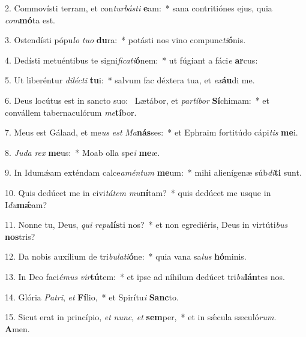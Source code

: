 2. Commovísti terram, et con\textit{tur}\textit{bás}\textit{ti} \textbf{e}am:~*  sana contritiónes ejus, quia \textit{com}\textbf{mó}ta est.\

3. Ostendísti pópu\textit{lo} \textit{tu}\textit{o} \textbf{du}ra:~*  potásti nos vino compunc\textit{ti}\textbf{ó}nis.\

4. Dedísti metuéntibus te signi\textit{fi}\textit{ca}\textit{ti}\textbf{ó}nem:~*  ut fúgiant a fáci\textit{e} \textbf{ar}cus:\

5. Ut liberéntur \textit{di}\textit{léc}\textit{ti} \textbf{tu}i:~*  salvum fac déxtera tua, et \textit{ex}\textbf{áu}di me.\

6. Deus locútus est in sancto suo: \dag\  Lætábor, et \textit{par}\textit{tí}\textit{bor} \textbf{Sí}chimam:~*  et convállem tabernaculórum \textit{me}\textbf{tí}bor.\

7. Meus est Gálaad, et me\textit{us} \textit{est} \textit{Ma}\textbf{nás}ses:~*  et Ephraim fortitúdo cápi\textit{tis} \textbf{me}i.\

8. \textit{Ju}\textit{da} \textit{rex} \textbf{me}us:~*  Moab olla spe\textit{i} \textbf{me}æ.\

9. In Idumǽam exténdam calce\textit{a}\textit{mén}\textit{tum} \textbf{me}um:~*  mihi alienígenæ súb\textit{di}\textbf{ti} sunt.\

10. Quis dedúcet me in civi\textit{tá}\textit{tem} \textit{mu}\textbf{ní}tam?~*  quis dedúcet me usque in I\textit{du}\textbf{mǽ}am?\

11. Nonne tu, Deus, \textit{qui} \textit{re}\textit{pu}\textbf{lís}ti nos?~*  et non egrediéris, Deus in virtúti\textit{bus} \textbf{nos}tris?\

12. Da nobis auxílium de tri\textit{bu}\textit{la}\textit{ti}\textbf{ó}ne:~*  quia vana sa\textit{lus} \textbf{hó}minis.\

13. In Deo faci\textit{é}\textit{mus} \textit{vir}\textbf{tú}tem:~*  et ipse ad níhilum dedúcet tri\textit{bu}\textbf{lán}tes nos.\

14. Glória \textit{Pa}\textit{tri}, \textit{et} \textbf{Fí}lio,~*  et Spirítu\textit{i} \textbf{Sanc}to.\

15. Sicut erat in princípio, \textit{et} \textit{nunc}, \textit{et} \textbf{sem}per,~*  et in sǽcula sæculó\textit{rum}. \textbf{A}men.\

